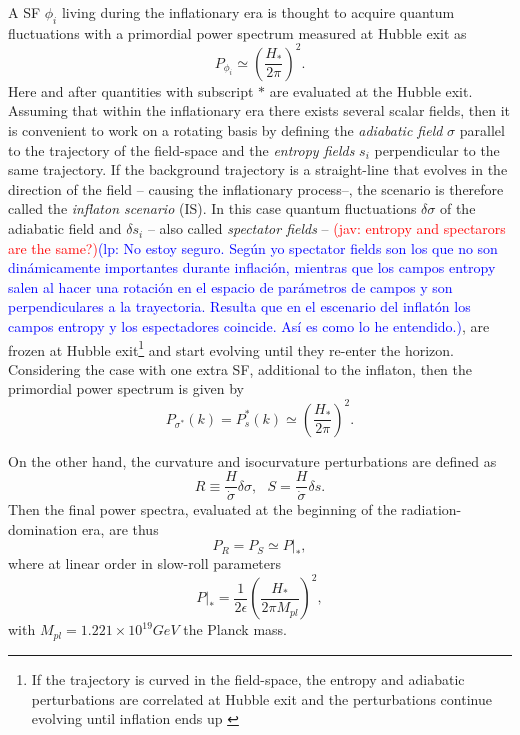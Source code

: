 \documentclass[amssymb,twocolumn,prd,nofootinbib,showpacs]{revtex4-1}
\newcommand{\jav}[1]{\textcolor{red}{(jav: #1)}}
\newcommand{\lp}[1]{\textcolor{blue}{(lp: #1)}}
\begin{document}
%
A  SF $\phi_i$ living  during  the  inflationary  era  is  thought
to acquire quantum fluctuations with a primordial power
spectrum measured at Hubble exit as
\begin{equation}\label{eq1}
P_{\phi_i}\simeq\left(\frac{H_*}{2\pi}\right)^2.
\end{equation}
Here  and  after  quantities  with subscript $*$  are evaluated at the Hubble exit. 
%
Assuming that within the inflationary era there exists several scalar fields,  then it  is  convenient  to  work  on  
a  rotating  basis by defining the \textit{adiabatic field} $\sigma$ parallel  to  the  trajectory  of the field-space 
 and the \textit{entropy fields} $s_i$ perpendicular to the same trajectory. 
 If the background trajectory is a straight-line that evolves in the direction of the field  -- causing the inflationary process--, 
 the scenario is therefore called the \textit{inflaton scenario} (IS). 
 In this  case quantum fluctuations $\delta\sigma$ of  the  adiabatic field  and $\delta s_i$ -- also  
 called  \textit{spectator fields} --  \jav{entropy and spectarors are the same?}\lp{No estoy seguro. 
 Seg\'un yo spectator fields son los que no son din\'amicamente importantes durante inflaci\'on, 
 mientras que los campos entropy salen al hacer una rotaci\'on en el espacio de par\'ametros de 
 campos y son perpendiculares a la trayectoria. Resulta que en el escenario del inflat\'on los campos 
 entropy y los espectadores coincide. As\'i es como lo he entendido.}, 
 are frozen at Hubble exit\footnote{If the trajectory is curved in the field-space, 
 the entropy and adiabatic perturbations are correlated at Hubble exit and the 
 perturbations continue evolving until inflation ends up \cite{twofields}} and start evolving 
 until they re-enter the horizon. Considering the case with one extra SF, 
 additional to the inflaton, then the primordial power spectrum is given by
\begin{equation}\label{eq2}
P_{\sigma^*}(k)=P_{s}^*(k)\simeq\left(\frac{H_*}{2\pi}\right)^2.
\end{equation}

On the other hand, the curvature and isocurvature perturbations are defined as
%
\begin{equation}\label{RS}
R\equiv\frac{H}{\dot\sigma}\delta \sigma, \ \ \ S=\frac{H}{\dot \sigma}\delta s.
\end{equation}
Then the final power spectra, evaluated at the beginning of the radiation-domination era, are thus
%
\begin{equation}\label{PRf}
P_R=P_S\simeq P|_*,
\end{equation}
%
where at linear order in slow-roll parameters
%
\begin{equation}
P|_*=\frac{1}{2\epsilon}\left(\frac{H_*}{2\pi M_{pl}}\right)^2,
\end{equation}
%
with $M_{pl}=1.221\times 10^{19}GeV$ the Planck mass.\\
\end{document}
